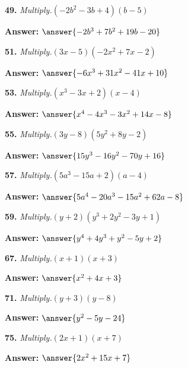 \documentclass{ximera}
\begin{document}
\begin{problem}
\textbf{49.} \emph{Multiply.}\quad $(-2b^2 - 3b + 4)(b - 5)$

\textbf{Answer:} $\answer{-2b^3 +7b^2 +19b -20}$
\end{problem}

\begin{problem}
\textbf{51.} \emph{Multiply.}\quad $(3x - 5)(-2x^2 + 7x - 2)$

\textbf{Answer:} $\answer{-6x^3 +31x^2 -41x +10}$
\end{problem}

\begin{problem}
\textbf{53.} \emph{Multiply.}\quad $(x^3 - 3x + 2)(x - 4)$

\textbf{Answer:} $\answer{x^4 -4x^3 -3x^2 +14x -8}$
\end{problem}

\begin{problem}
\textbf{55.} \emph{Multiply.}\quad $(3y - 8)(5y^2 + 8y - 2)$

\textbf{Answer:} $\answer{15y^3 -16y^2 -70y +16}$
\end{problem}

\begin{problem}
\textbf{57.} \emph{Multiply.}\quad $(5a^3 - 15a + 2)(a - 4)$

\textbf{Answer:} $\answer{5a^4 -20a^3 -15a^2 +62a -8}$
\end{problem}

\begin{problem}
\textbf{59.} \emph{Multiply.}\quad $(y + 2)(y^3 + 2y^2 - 3y + 1)$

\textbf{Answer:} $\answer{y^4 +4y^3 +y^2 -5y +2}$
\end{problem}

\begin{problem}
\textbf{67.} \emph{Multiply.}\quad $(x + 1)(x + 3)$

\textbf{Answer:} $\answer{x^2 +4x +3}$
\end{problem}

\begin{problem}
\textbf{71.} \emph{Multiply.}\quad $(y + 3)(y - 8)$

\textbf{Answer:} $\answer{y^2 -5y -24}$
\end{problem}

\begin{problem}
\textbf{75.} \emph{Multiply.}\quad $(2x + 1)(x + 7)$

\textbf{Answer:} $\answer{2x^2 +15x +7}$
\end{problem}
\end{document}
